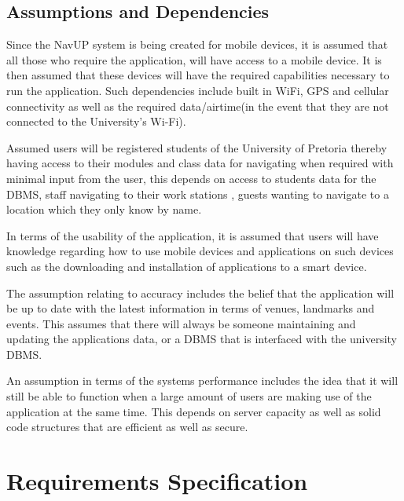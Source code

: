 \documentclass[11pt, a4paper]{article}
\begin{document}
	\subsection{Assumptions and Dependencies}
	Since the NavUP system is being created for mobile devices,  it is assumed that all those who require the application,  will have access to a mobile device. It is then assumed that these devices will have the required capabilities necessary to run the application. Such dependencies include built in WiFi,  GPS and cellular connectivity as well as the required data/airtime(in the event that they are not connected to the University's Wi-Fi).
\\
\par
Assumed users will be registered students of the University of Pretoria thereby having access to their modules and class data for navigating when required with minimal input from the user, this depends on access to students data for the DBMS, staff navigating to their work stations , guests wanting to navigate to a location which they only know by name.
\\
\par
In terms of the usability of the application,  it is assumed that users will have knowledge regarding how to use mobile devices and applications on such devices such as the downloading and installation of applications to a smart device.
\\
\par
The assumption relating to accuracy includes the belief that the application will be up to date with the latest information in terms of venues,  landmarks and events. This assumes that there will always be someone maintaining and updating the applications data,  or a DBMS that is interfaced with the university DBMS.  
\\
\par
An assumption in terms of the systems performance includes the idea that it will still be able to function when a large amount of users are making use of the application at the same time. This depends on server capacity as well as solid code structures that are efficient as well as secure.

	
\newpage
\section{Requirements Specification}		
		
\end{document}
